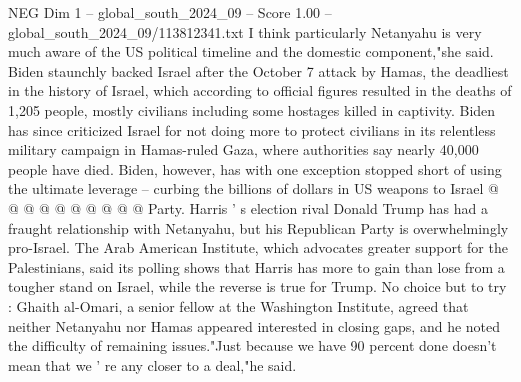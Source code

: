 \begin{textsample}{NEG Dim 1 – global\_south\_2024\_09 – Score 1.00 – global\_south\_2024\_09/113812341.txt}
I think particularly Netanyahu is very much aware of the US political timeline and the domestic component,"she said.
Biden staunchly backed Israel after the October 7 attack by Hamas, the deadliest in the history of Israel, which according to official figures resulted in the deaths of 1,205 people, mostly civilians including some hostages killed in captivity.
Biden has since criticized Israel for not doing more to protect civilians in its relentless military campaign in Hamas-ruled Gaza, where authorities say nearly 40,000 people have died.
Biden, however, has with one exception stopped short of using the ultimate leverage -- curbing the billions of dollars in US weapons to Israel @ @ @ @ @ @ @ @ @ @ Party.
Harris ' s election rival Donald Trump has had a fraught relationship with Netanyahu, but his Republican Party is overwhelmingly pro-Israel.
The Arab American Institute, which advocates greater support for the Palestinians, said its polling shows that Harris has more to gain than lose from a tougher stand on Israel, while the reverse is true for Trump.
No choice but to try : Ghaith al-Omari, a senior fellow at the Washington Institute, agreed that neither Netanyahu nor Hamas appeared interested in closing gaps, and he noted the difficulty of remaining issues."Just because we have 90 percent done doesn't mean that we ' re any closer to a deal,"he said.

\end{textsample}
